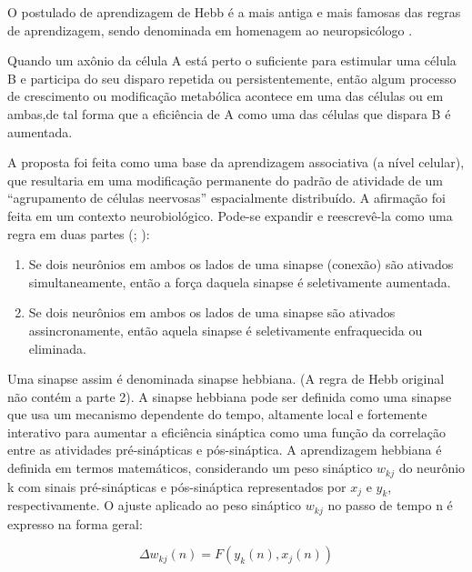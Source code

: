 O postulado de aprendizagem de Hebb é a mais antiga e mais famosas das regras de aprendizagem, sendo denominada em homenagem ao neuropsicólogo . 

    \begin{citacao}
        Quando um axônio da célula A está perto o suficiente para estimular uma célula B e participa do seu disparo repetida ou persistentemente, então algum processo de crescimento ou modificação metabólica acontece em uma das células ou em ambas,de tal forma que a eficiência de A como uma das células que dispara B é aumentada.
    \end{citacao}
    
    A proposta foi feita como uma base da aprendizagem associativa (a nível celular), que resultaria em uma modificação permanente do padrão de atividade de um ``agrupamento de células neervosas'' espacialmente distribuído. A afirmação foi feita em um contexto neurobiológico. Pode-se expandir e reescrevê-la como uma regra em duas partes (; ):
    \begin{enumerate}
        \item Se dois neurônios em ambos os lados de uma sinapse (conexão) são ativados simultaneamente, então a força daquela sinapse é seletivamente aumentada.
        \item Se dois neurônios em ambos os lados de uma sinapse são ativados assincronamente, então aquela sinapse é seletivamente enfraquecida ou eliminada.
    \end{enumerate}

Uma sinapse assim é denominada sinapse hebbiana. (A regra de Hebb original não contém a parte 2). A sinapse hebbiana pode ser definida como uma sinapse que usa um mecanismo dependente do tempo, altamente local e fortemente interativo para aumentar a eficiência sináptica como uma função da correlação entre as atividades pré-sinápticas e pós-sináptica.
A aprendizagem hebbiana é definida em termos matemáticos, considerando um peso sináptico $w_{kj}$ do neurônio k com sinais pré-sinápticas e pós-sináptica representados por $x_{j}$ e $y_{k}$, respectivamente. O ajuste aplicado ao peso sináptico $w_{kj}$ no passo de tempo n é expresso na forma geral:

\begin{equation} \label{eq:hebb1}
    \Delta w_{kj}(n) = F(y_{k}(n), x_{j}(n))
\end{equation}


